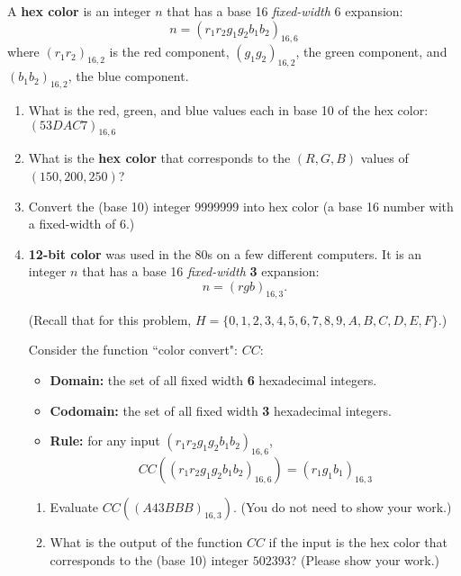 \documentclass[10pt,letterpaper,unboxed,cm]{article}
\begin{document}
\begin{enumerate}
	      A {\bf hex color} is an integer $n$ that has a base 16 \emph{fixed-width} 6 expansion:
	      $$n = (r_1r_2g_1g_2b_1b_2)_{16,6}$$
	      where $(r_1r_2)_{16,2}$ is the red component, $(g_1g_2)_{16,2}$, the green component, and $(b_1b_2)_{16,2}$, the blue component.


	      \begin{enumerate}
		      \item
		            What is the red, green, and blue values each in base 10 of the hex color: $(53DAC7)_{16,6}$
		      \item
		            What is the {\bf hex color} that corresponds to the $(R,G,B)$ values of $(150,200,250)$?
		      \item
		            Convert the (base 10) integer 9999999 into hex color (a base 16 number with a fixed-width of 6.)
		      \item
		            {\bf 12-bit color} was used in the 80s on a few different computers. It is an integer $n$ that has a base 16 \emph{fixed-width} {\bf 3} expansion:
		            $$n=(rgb)_{16,3}.$$

		            (Recall that for this problem, $H=\{0,1,2,3,4,5,6,7,8,9,A,B,C,D,E,F\}$.)

		            Consider the function ``color convert":
		            $CC:$
		            \begin{itemize}
			            \item {\bf Domain:} the set of all fixed width {\bf 6} hexadecimal integers.
			            \item {\bf Codomain:} the set of all fixed width {\bf 3} hexadecimal integers.
			            \item {\bf Rule:} for any input $(r_1r_2g_1g_2b_1b_2)_{16,6}$,
			                  $$CC((r_1r_2g_1g_2b_1b_2)_{16,6})=
				                  (r_1g_1b_1)_{16,3}$$
		            \end{itemize}

		            \begin{enumerate}
			            \item
			                  Evaluate $CC((A43BBB)_{16,3})$. (You do not need to show your work.)
			            \item
			                  What is the output of the function $CC$ if the input is the hex color that corresponds to the (base 10) integer $502393$? (Please show your work.)
		            \end{enumerate}
	      \end{enumerate}



\end{enumerate}
\end{document}
